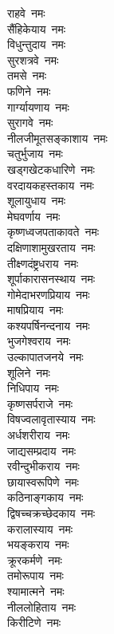\begin{flushleft}
\begin{multicols}{2}
राहवे~नमः\\
सैंहिकेयाय~नमः\\
विधुन्तुदाय~नमः\\
सुरशत्रवे~नमः\\
तमसे~नमः\\
फणिने~नमः\\
गार्ग्यायणाय~नमः\\
सुरागवे~नमः\\
नीलजीमूतसङ्काशाय~नमः\\
चतुर्भुजाय~नमः\hfill{}\\
खड्गखेटकधारिणे~नमः\\
वरदायकहस्तकाय~नमः\\
शूलायुधाय~नमः\\
मेघवर्णाय~नमः\\
कृष्णध्वजपताकावते~नमः\\
दक्षिणाशामुखरताय~नमः\\
तीक्ष्णदंष्ट्रधराय~नमः\\
शूर्पाकारासनस्थाय~नमः\\
गोमेदाभरणप्रियाय~नमः\\
माषप्रियाय~नमः\hfill{}\\
कश्यपर्षिनन्दनाय~नमः\\
भुजगेश्वराय~नमः\\
उल्कापातजनये~नमः\\
शूलिने~नमः\\
निधिपाय~नमः\\
कृष्णसर्पराजे~नमः\\
विषज्वलावृतास्याय~नमः\\
अर्धशरीराय~नमः\\
जाद्यसम्प्रदाय~नमः\\
रवीन्दुभीकराय~नमः\hfill{}\\
छायास्वरूपिणे~नमः\\
कठिनाङ्गकाय~नमः\\
द्विषच्चक्रच्छेदकाय~नमः\\
करालास्याय~नमः\\
भयङ्कराय~नमः\\
क्रूरकर्मणे~नमः\\
तमोरूपाय~नमः\\
श्यामात्मने~नमः\\
नीललोहिताय~नमः\\
किरीटिणे~नमः\hfill{}\\

\end{multicols}
\end{flushleft}
